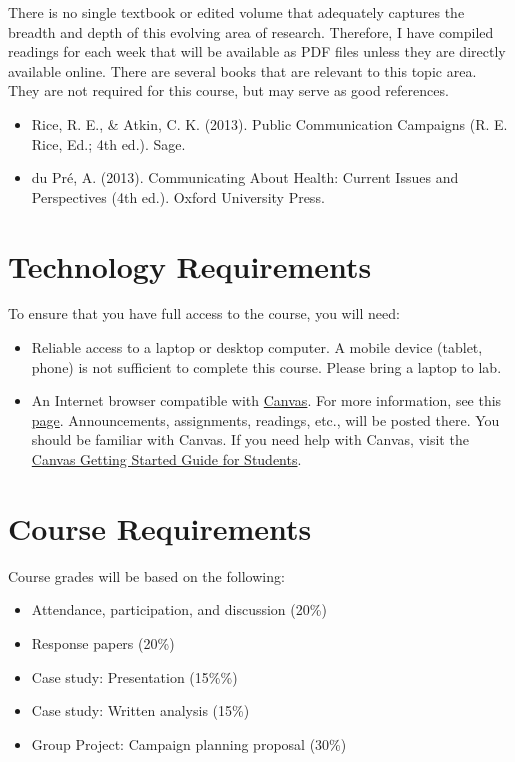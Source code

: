 \documentclass[
  letterpaper,
]{article}
\providecommand{\tightlist}{%
  \setlength{\itemsep}{0pt}\setlength{\parskip}{0pt}}\usepackage{longtable,booktabs,array}
\begin{document}
There is no single textbook or edited volume that adequately captures
the breadth and depth of this evolving area of research. Therefore, I
have compiled readings for each week that will be available as PDF files
unless they are directly available online. There are several books that
are relevant to this topic area. They are not required for this course,
but may serve as good references.

\begin{itemize}
\item
  Rice, R. E., \& Atkin, C. K. (2013). Public Communication Campaigns
  (R. E. Rice, Ed.; 4th ed.). Sage.
\item
  du Pré, A. (2013). Communicating About Health: Current Issues and
  Perspectives (4th ed.). Oxford University Press.
\end{itemize}

\hypertarget{sec-tech}{%
\section{Technology Requirements}\label{sec-tech}}

To ensure that you have full access to the course, you will need:

\begin{itemize}
\item
  Reliable access to a laptop or desktop computer. A mobile device
  (tablet, phone) is not sufficient to complete this course. Please
  bring a laptop to lab.
\item
  An Internet browser compatible with
  \href{https://utah.instructure.com/}{Canvas}. For more information,
  see this
  \href{https://community.canvaslms.com/docs/DOC-10720-67952720329}{page}.
  Announcements, assignments, readings, etc., will be posted there. You
  should be familiar with Canvas. If you need help with Canvas, visit
  the \href{https://community.canvaslms.com/docs/DOC-10701}{Canvas
  Getting Started Guide for Students}.
\end{itemize}

\hypertarget{sec-requirements}{%
\section{Course Requirements}\label{sec-requirements}}

Course grades will be based on the following:

\begin{itemize}
\tightlist
\item
  Attendance, participation, and discussion (20\%)
\item
  Response papers (20\%)
\item
  Case study: Presentation (15\%\%)
\item
  Case study: Written analysis (15\%)
\item
  Group Project: Campaign planning proposal (30\%)
\end{itemize}
\end{document}
